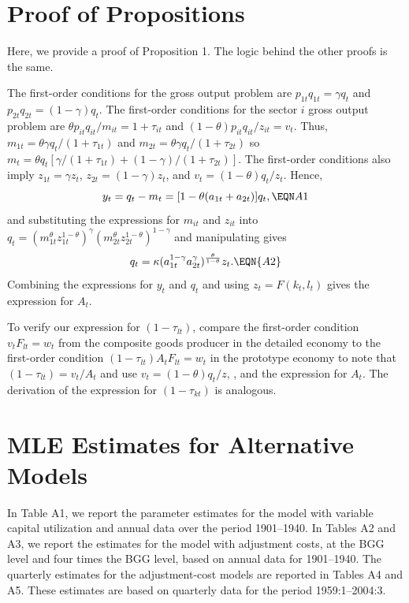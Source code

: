 \section{Proof of Propositions}

Here, we provide a proof of Proposition 1.  The
logic behind the other proofs is the same.

The first-order conditions for the gross output
problem are 
$p_{1t}q_{1t}=\gamma q_t$ 
and
$p_{2t}q_{2t}=(1-\gamma) q_t$.
The first-order conditions for the sector $i$ gross
output problem are
$\theta p_{it}q_{it}/m_{it}=1+\tau_{it}$
and $(1-\theta)p_{it}q_{it}/z_{it}=v_t$.
Thus, 
$m_{1t}=\theta\gamma q_t/(1+\tau_{1t})$
and 
$m_{2t}=\theta\gamma q_t/(1+\tau_{2t})$
so 
$m_t=\theta q_t[\gamma/(1+\tau_{1t})+(1-\gamma)/(1+\tau_{2t})]$.
The first-order conditions also imply $z_{1t}=\gamma z_t$,
$z_{2t}=(1-\gamma)z_t$, and $v_t=(1-\theta)q_t/z_t$.
Hence,
$$
 y_t = q_t - m_t = [1-\theta(a_{1t}+a_{2t})]q_t,
\EQN A1
$$
and substituting the expressions for $m_{it}$ and $z_{it}$
into $q_t=(m_{1t}^\theta z_{1t}^{1-\theta})^\gamma
          (m_{2t}^\theta z_{2t}^{1-\theta })^{1-\gamma}$ 
and manipulating gives
$$
q_{t}=\kappa (a_{1t}^{1-\gamma }a_{2t}^{\gamma })^{\theta \over 1-\theta} z_t.  
\EQN {A2}
$$
Combining the expressions for $y_t$ and $q_t$ and using 
$z_t=F(k_t,l_t)$ gives the expression for $A_t$.

To verify our expression for $(1-\tau _{lt})$, compare the first-order
condition $v_{t}F_{lt}=w_{t}$ from the composite goods producer in the
detailed economy to the first-order condition 
$(1-\tau_{lt})A_tF_{lt}=w_t$
in the prototype economy to note that 
$(1-\tau_{lt})=v_t/A_t$
and use $v_t=(1-\theta )q_t/z$, , 
and the expression for $A_t$.
The derivation of the expression for $(1-\tau _{kt})$ is analogous. 

\section{MLE Estimates for Alternative Models}

In Table A1, we report the parameter estimates for
the model with variable capital utilization  and annual data
over the period 1901--1940.
In Tables A2 and A3, we report the estimates for
the model with adjustment costs, at the BGG level
and four times the BGG level, based on annual data
for 1901--1940.  The quarterly estimates for the 
adjustment-cost models are reported in Tables A4 and
A5.  These estimates are based on quarterly data
for the period 1959:1--2004:3.   

